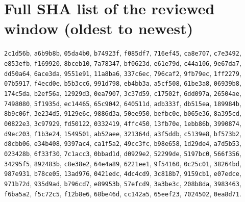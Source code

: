 \documentclass[11pt]{article}
\theoremstyle{definition}
\theoremstyle{remark}
\begin{document}
\section{Full SHA list of the reviewed window (oldest to newest)}\label{app:shas}
{\small\raggedright
\texttt{2c1d56b}, \texttt{a6b9b8b}, \texttt{05da4b0}, \texttt{b74923f}, \texttt{f085df7}, \texttt{716ef45}, \texttt{ca8e707}, \texttt{c7e3492}, \texttt{e853efb}, \texttt{f169920}, \texttt{8bceb10}, \texttt{7a78347}, \texttt{bf0623d}, \texttt{e61e79d}, \texttt{c44a106}, \texttt{9e67da7}, \texttt{dd50a64}, \texttt{6ace3da}, \texttt{9551e91}, \texttt{11a8ba6}, \texttt{337c6ec}, \texttt{796caf2}, \texttt{9fb79ec}, \texttt{1ff2279}, \texttt{07b5917}, \texttt{f4ecd0e}, \texttt{b5b3cc6}, \texttt{991d798}, \texttt{eb4bb3a}, \texttt{a5cf508}, \texttt{61be3a8}, \texttt{06939b8}, \texttt{174c5da}, \texttt{b2ef56a}, \texttt{12929d3}, \texttt{0ea7907}, \texttt{3c37d59}, \texttt{c17502f}, \texttt{6dd097a}, \texttt{26504ae}, \texttt{7498080}, \texttt{5f1935d}, \texttt{ec14465}, \texttt{65c9042}, \texttt{640511d}, \texttt{adb333f}, \texttt{db515ea}, \texttt{189984b}, \texttt{8b9c06f}, \texttt{3e234d5}, \texttt{9129e6c}, \texttt{9886d3a}, \texttt{50ee950}, \texttt{befbc0e}, \texttt{b065e36}, \texttt{8a395cd}, \texttt{00822e3}, \texttt{3c97929}, \texttt{fd50122}, \texttt{0332419}, \texttt{4ffc450}, \texttt{13fb70e}, \texttt{1ebb86b}, \texttt{3990874}, \texttt{d9ec203}, \texttt{f1b3e24}, \texttt{1549501}, \texttt{ab52aee}, \texttt{321364d}, \texttt{a3f5ddb}, \texttt{c5139e8}, \texttt{bf573b2}, \texttt{d8cbb06}, \texttt{e34b408}, \texttt{9397ac4}, \texttt{ca1f5a2}, \texttt{49cc3fc}, \texttt{b98e658}, \texttt{1d29de4}, \texttt{a7d5b53}, \texttt{023428b}, \texttt{6f33f30}, \texttt{7c1acc3}, \texttt{0bbad1d}, \texttt{d0929e2}, \texttt{52299de}, \texttt{5197bc0}, \texttt{566f356}, \texttt{34295f5}, \texttt{892483b}, \texttt{c8e38e2}, \texttt{64e4a89}, \texttt{6221ee1}, \texttt{9f54160}, \texttt{0c25c01}, \texttt{38264bd}, \texttt{987e931}, \texttt{b78ce05}, \texttt{13ad976}, \texttt{0421edc}, \texttt{4dc4cd9}, \texttt{3c818b7}, \texttt{9159cb1}, \texttt{e07edce}, \texttt{971b72d}, \texttt{935d9ad}, \texttt{b796cd7}, \texttt{e89953b}, \texttt{57efcd9}, \texttt{3a3be3c}, \texttt{208b8da}, \texttt{3983463}, \texttt{f6ba5a2}, \texttt{f5c72c5}, \texttt{f12b8e6}, \texttt{68be46d}, \texttt{cc142a5}, \texttt{65eef23}, \texttt{7024502}, \texttt{0ea8d71}.
\par}
\end{document}
